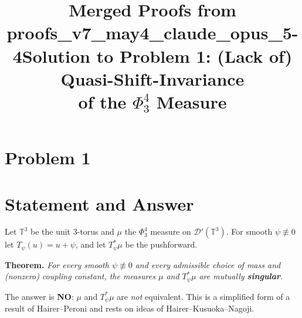 \documentclass[11pt]{article}
\title{Merged Proofs from proofs\_v7\_may4\_claude\_opus\_5-4}
\author{}
\date{}
\begin{document}
\maketitle
\tableofcontents


\clearpage
\section*{Problem 1}
\begingroup
\hypersetup{colorlinks=true,
            linkcolor=blue!50!black,
            citecolor=blue!50!black,
            urlcolor=blue!50!black}
\newcommand{\qoneT}{\mathbb{T}}
\newcommand{\qoneR}{\mathbb{R}}
\newcommand{\qoneN}{\mathbb{N}}
\newcommand{\qoneC}{\mathcal{C}}
\newcommand{\qoneD}{\mathcal{D}}
\newcommand{\qoneE}{\mathbb{E}}
\newcommand{\qoneHp}{H}      %
\newcommand{\qonePN}{P_N}
\newcommand{\qoneLin}{\mathbf{l}}   %
\newcommand{\qoneLsq}{\mathbf{q}}   %
\newcommand{\qoneLcb}{\mathbf{c}}   %
\newcommand{\qoneIqc}{\mathbf{C}}   %
\newtheorem{qonetheorem}{Theorem}
\newtheorem{qonelemma}{Lemma}
\newtheorem{qoneproposition}{Proposition}
\newtheorem{qonecorollary}{Corollary}
\title{Solution to Problem 1: (Lack of) Quasi-Shift-Invariance\\
of the $\Phi^4_3$ Measure}
\author{}
\date{}
\maketitle


\section*{Statement and Answer}

Let $\qoneT^3$ be the unit $3$-torus and $\mu$ the $\Phi^4_3$ measure on
$\qoneD'(\qoneT^3)$. For smooth $\psi\not\equiv0$ let $T_\psi(u)=u+\psi$, and let
$T_\psi^*\mu$ be the pushforward.

\medskip
\noindent\textbf{Theorem.} \emph{For every smooth $\psi\not\equiv0$ and every
admissible choice of mass and (nonzero) coupling constant, the measures $\mu$ and
$T_\psi^*\mu$ are mutually \textbf{singular}.}

\medskip
\noindent The answer is \textbf{NO}: $\mu$ and $T_\psi^*\mu$ are \emph{not}
equivalent. This is a simplified form of a result of Hairer--Peroni and rests on
ideas of Hairer--Kusuoka--Nagoji.
\end{document}
